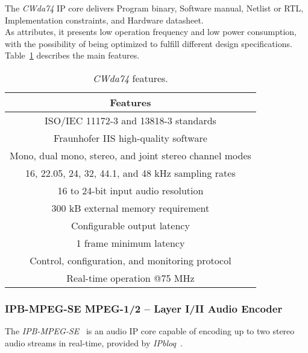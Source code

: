The \textit{CWda74} IP core delivers Program binary, Software manual, Netlist or RTL, Implementation constraints, and Hardware datasheet.\\
As attributes, it presents low operation frequency and low power consumption, with the possibility of being optimized to fulfill different design specifications.
Table~\ref{tab:coreworks} describes the main features.

\vspace{0.5cm}

\begin{table}[h]
    \centering
    \begin{tabular}{|c|}
        \hline
        \textbf{Features} \\
        \hline
         ISO/IEC 11172-3 and 13818-3 standards \\
         \hline
         Fraunhofer IIS high-quality software\\
         \hline
         Mono, dual mono, stereo, and joint stereo channel modes \\
         \hline
         16, 22.05, 24, 32, 44.1, and 48 kHz sampling rates \\
         \hline
         16 to 24-bit input audio resolution \\
         \hline
         300 kB external memory requirement\\
         \hline
         Configurable output latency \\
         \hline
         1 frame minimum latency\\
         \hline
         Control, configuration, and monitoring protocol \\
         \hline
         Real-time operation @75 MHz \\
         \hline
    \end{tabular}
    \caption{\textit{CWda74} features.}
    \label{tab:coreworks}
\end{table}

\vspace{0.5cm}

\subsubsection{IPB-MPEG-SE MPEG-1/2 – Layer I/II Audio Encoder}

The \textit{IPB-MPEG-SE}~\cite{ipb-mpeg-se} is an audio IP core capable of encoding up to two stereo audio streams in real-time, provided by \textit{IPbloq}~\cite{ipbloq}.

